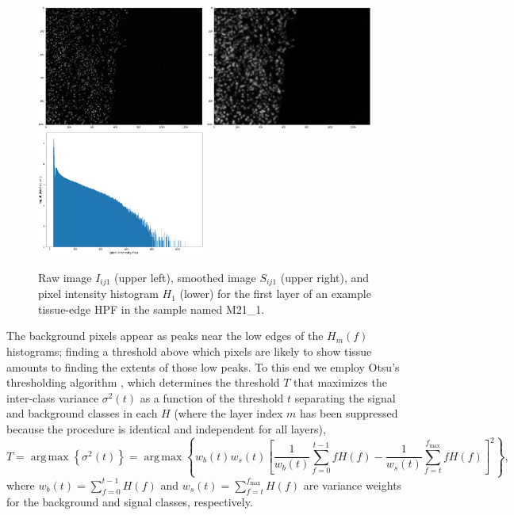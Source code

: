 \documentclass[letterpaper,11pt]{article}
\DeclareMathOperator*{\argmax}{arg\,max}
\newcommand{\fmax}{f_{\mathrm{max}}}
\begin{document}
\begin{figure}[!ht]
\centering
\includegraphics[width=0.49\textwidth]{images/masking/example_raw_image}
\includegraphics[width=0.49\textwidth]{images/masking/example_smoothed_image}
\includegraphics[width=0.49\textwidth]{images/masking/example_histogram}
\caption{\footnotesize Raw image $I_{ij1}$ (upper left), smoothed image $S_{ij1}$ (upper right), and pixel intensity histogram $H_{1}$ (lower) for the first layer of an example tissue-edge HPF in the sample named M21\_1.}
\label{fig:raw_to_smoothed_to_histogram}
\end{figure}

The background pixels appear as peaks near the low edges of the $H_{m}(f)$ histograms; finding a threshold above which pixels are likely to show tissue amounts to finding the extents of those low peaks. To this end we employ Otsu's thresholding algorithm \cite{4310076}, which determines the threshold $T$ that maximizes the inter-class variance $\sigma^2(t)$ as a function of the threshold $t$ separating the signal and background classes in each $H$ (where the layer index $m$ has been suppressed because the procedure is identical and independent for all layers),
\begin{equation}
T = \argmax{ \left\{ \sigma^2(t) \right\} } = \argmax{ \left\{ w_{b}(t) w_{s}(t) \left[ \frac{1}{w_{b}(t)}\sum_{f=0}^{t-1} f H(f) - \frac{1}{w_{s}(t)}\sum_{f=t}^{\fmax} f H(f) \right]^2 \right\} },
\label{eq:otsu_threshold_def}
\end{equation}  
where $w_{b}(t) = \sum_{f=0}^{t-1} H(f)$ and $w_{s}(t) = \sum_{f=t}^{\fmax} H(f)$ are variance weights for the background and signal classes, respectively.
\end{document}
